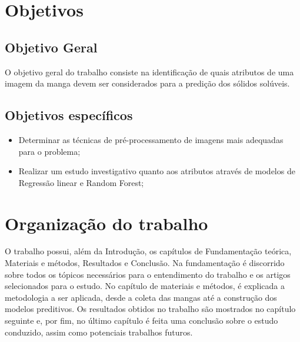 \section{Objetivos}

\subsection{Objetivo Geral}
O objetivo geral do trabalho consiste na identificação de quais atributos de uma imagem da manga devem ser considerados para a predição dos sólidos solúveis. 

\subsection{Objetivos específicos}

\begin{itemize}
	\item Determinar as técnicas de pré-processamento de imagens mais adequadas para o problema;
    \item Realizar um estudo investigativo quanto aos atributos através de modelos de Regressão linear e Random Forest;
\end{itemize}

\section{Organização do trabalho}

O trabalho possui, além da Introdução, os capítulos de Fundamentação teórica, Materiais e métodos, Resultados e Conclusão. Na fundamentação é discorrido sobre todos os tópicos necessários para o entendimento do trabalho e os artigos selecionados para o estudo. No capítulo de materiais e métodos, é explicada a metodologia a ser aplicada, desde a coleta das mangas até a construção dos modelos preditivos. Os resultados obtidos no trabalho são mostrados no capítulo seguinte e, por fim, no último capítulo é feita uma conclusão sobre o estudo conduzido, assim como potenciais trabalhos futuros.
